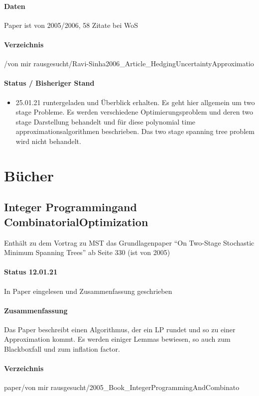 \documentclass[paper=a4,10pt]{scrartcl}
\begin{document}
\paragraph{Daten} Paper ist von 2005/2006, 58 Zitate bei WoS
\paragraph{Verzeichnis}  /von mir rausgesucht/Ravi-Sinha2006\_Article\_HedgingUncertaintyApproximatio
\paragraph{Status / Bisheriger Stand}
\begin{itemize}
\item 25.01.21 runtergeladen und Überblick erhalten. Es geht hier allgemein um two stage Probleme. Es werden verschiedene Optimierungsproblem und deren two stage Darstellung behandelt und für diese polynomial time approximationsalgorithmen beschrieben. Das two stage spanning tree problem wird nicht behandelt.
\end{itemize}

\section{Bücher}
\subsection{Integer Programmingand CombinatorialOptimization}
\label{sec:paper_on}
Enthält zu dem Vortrag zu MST das Grundlagenpaper ``On Two-Stage Stochastic Minimum Spanning Trees'' ab Seite 330 (ist von 2005)

\paragraph{Status 12.01.21} In Paper eingelesen und Zusammenfassung geschrieben
\paragraph{Zusammenfassung}	Das Paper beschreibt einen Algorithmus, der ein LP rundet und so zu einer Approximation kommt. Es werden einiger Lemmas bewiesen, so auch zum Blackboxfall und zum inflation factor.
\paragraph{Verzeichnis} paper/von mir rausgesucht/2005\_Book\_IntegerProgrammingAndCombinato
\end{document}
